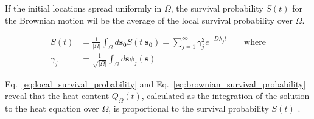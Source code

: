 If the initial locations spread uniformly in $\Omega$, the survival
probability $S(t)$ for the Brownian motion wil be the average of the
local survival probability over $\Omega$.

\begin{align}
  S(t) &= \frac{1}{|\Omega|} \int_{\Omega} d\bm{s_0} S(t | \bm{s_0}) = \sum_{j=1}^{\infty} \gamma^2_{j} e^{-D\lambda_jt} \qquad \text{where} \label{eq:brownian_survival_probability} \\
  \gamma_{j} &= \frac{1}{\sqrt{|\Omega|}}\int_{\Omega} d\bm{s}\phi_{j}(\bm{s}) \label{eq:coeff_sum}
\end{align}


Eq.~\ref{eq:local_survival_probability} and
Eq.~\ref{eq:brownian_survival_probability} reveal that the heat
content $Q_{\Omega}(t)$, calculated as the integration of the solution
to the heat equation over $\Omega$, is proportional to the survival
probability $S(t)$ \cite{kalinay2011survival}. 

